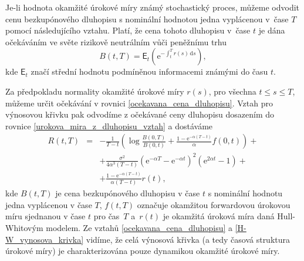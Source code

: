 \documentclass[a4paper,12pt]{report}
\theoremstyle{definition} \newtheorem{definice}[veta]{Definice}
\theoremstyle{remark}
\begin{document}
Je-li hodnota okamžité úrokové míry známý stochastický proces, můžeme odvodit cenu bezkupónového dluhopisu s nominální hodnotou jedna vyplácenou v~čase $T$ pomocí následujícího vztahu.
Platí, že cena tohoto dluhopisu v~čase $t$ je dána očekáváním ve světe rizikově neutrálním vůči peněžnímu trhu
\begin{equation}\label{ocekavana_cena_dluhopisu}
B(t,T)=\mathsf{E}_t\left(\mathrm{e}^{-\int_{t}^T r(s)\,\mathrm{d}s}\right),
\end{equation}
kde $\mathsf{E}_t$ značí střední hodnotu podmíněnou informacemi známými do času $t$.

Za předpokladu normality okamžité úrokové míry $r(s)$, pro všechna $t\leq s\leq T$, můžeme určit očekávání v rovnici \eqref{ocekavana_cena_dluhopisu}.
Vztah pro výnosovou křivku pak odvodíme z očekávané ceny dluhopisu dosazením do rovnice \eqref{urokova_mira_z_dluhopisu_vztah} a dostáváme
\begin{eqnarray}\label{H-W_vynosova_krivka}
R(t,T)&=&-\frac{1}{T-t}\left(\log \frac{B(0,T)}{B(0,t)}+\frac{1-\mathrm{e}^{-\alpha(T-t)}}{\alpha}f(0,t)\right)+ \nonumber\\
&&+\frac{\sigma^2}{4\alpha^3(T-t)}\left(\mathrm{e}^{-\alpha T}-\mathrm{e}^{-\alpha t}\right)^2\left(\mathrm{e}^{2\alpha t}-1\right)+  \nonumber\\
&&+\frac{1-\mathrm{e}^{-\alpha(T-t)}}{\alpha(T-t)}r(t),
\end{eqnarray}
kde $B(t,T)$ je cena bezkupónového dluhopisu v čase $t$ %
s nominální hodnotu jedna vyplácenou v čase $T$,
$f(t,T)$ označuje okamžitou forwardovou úrokovou míru sjednanou v čase $t$ pro čas~$T$ 
a~$r(t)$ je okamžitá úroková míra daná Hull-Whitovým modelem.
Ze vztahů \eqref{ocekavana_cena_dluhopisu} a \eqref{H-W_vynosova_krivka} vidíme, že celá výnosová křivka (a tedy časová struktura úrokové míry) je charakterizována pouze dynamikou okamžité úrokové míry.

\end{document}
